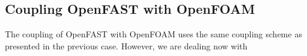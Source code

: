 \subsection{Coupling OpenFAST with OpenFOAM}

The coupling of OpenFAST with OpenFOAM uses the same coupling scheme as presented in the previous case. However, we are dealing now with 

